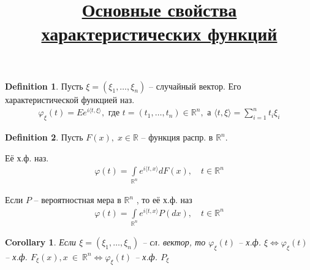\documentclass[a4paper]{article}
\theoremstyle{plain}
\newtheorem{corollary}{Corollary}
\theoremstyle{remark}
\theoremstyle{definition}
\newtheorem{definition}{Definition}
\newcommand{\setR}{\mathbb{R}}
\newcommand{\setRn}{\mathbb{R}^n}
\renewcommand{\phi}{\varphi}
\newcommand{\bigtitle}[1]{\title{\textbf{\underline{#1}}}}
\begin{document}
\begin{definition}
  Пусть $\xi = (\xi_1, \ldots, \xi_n) $ -- случайный вектор.
  Его характеристической функцией наз.
  \begin{align*}
    \phi_{\xi} (t) = E e^{i \langle t, \xi \rangle}, \text{ где } t = (t_1, \ldots, t_n) \in \setRn, 
    \text{ а } \langle t, \xi \rangle = \sum_{i = 1}^{n} t_i \xi_i
  \end{align*}
\end{definition}

\begin{definition}
  Пусть $F(x), \; x \in \setR$ -- функция распр. в $\setRn$.

  Её х.ф. наз.
  \begin{align*}
    \phi(t) = \int\limits_{\setRn} e^{i \langle t, x \rangle} dF(x),\quad t \in \setRn
  \end{align*}

  Если $P$ -- вероятностная мера в $\setRn$ , то её х.ф. наз
  \begin{align*}
    \phi(t) = \int\limits_{\setRn} e^{i \langle t, x \rangle} P(dx),\quad t \in \setRn
  \end{align*}
\end{definition}

\begin{corollary}
  Если $\xi = (\xi_1, \ldots, \xi_n)$ -- сл. вектор, то
  $\phi_\xi(t)$ -- х.ф. $\xi \iff \phi_\xi(t)$ -- х.ф. $F_\xi (x), x~\in~\setRn
  \iff \phi_\xi (t)$ -- х.ф. $P_\xi$
\end{corollary}
\bigtitle{Основные свойства характеристических функций}
\end{document}
